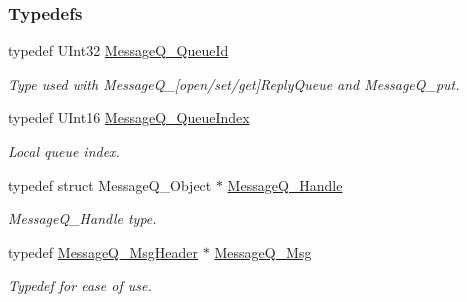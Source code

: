 \subsubsection*{Typedefs}
\begin{DoxyCompactItemize}
\item 
typedef UInt32 \hyperlink{_message_q_8h_a34dd32b58cf0476c2d90e3f702843297}{MessageQ\_\-QueueId}
\begin{DoxyCompactList}\small\item\em Type used with MessageQ\_\-\mbox{[}open/set/get\mbox{]}ReplyQueue and MessageQ\_\-put. \item\end{DoxyCompactList}\item 
typedef UInt16 \hyperlink{_message_q_8h_a22a5f41fd82f03f7c14f45dab647bada}{MessageQ\_\-QueueIndex}
\begin{DoxyCompactList}\small\item\em Local queue index. \item\end{DoxyCompactList}\item 
typedef struct MessageQ\_\-Object $\ast$ \hyperlink{_message_q_8h_a1d584ce08733ca864d81e1e64a41cf7a}{MessageQ\_\-Handle}
\begin{DoxyCompactList}\small\item\em MessageQ\_\-Handle type. \item\end{DoxyCompactList}\item 
typedef \hyperlink{struct_message_q___msg_header}{MessageQ\_\-MsgHeader} $\ast$ \hyperlink{_message_q_8h_ab675d3cdd0443a1ad05658d375458204}{MessageQ\_\-Msg}
\begin{DoxyCompactList}\small\item\em Typedef for ease of use. \item\end{DoxyCompactList}\end{DoxyCompactItemize}
